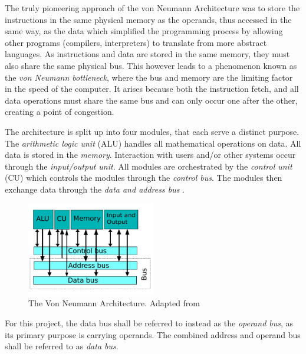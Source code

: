 The truly pioneering approach of the von Neumann Architecture was to store the instructions in the same physical memory as the operands, thus accessed in the same way, as the data which simplified the programming process by allowing other programs (compilers, interpreters) to translate from more abstract languages. As instructions and data are stored in the same memory, they must also share the same physical bus. This however leads  to a phenomenon known as the \textit{von Neumann bottleneck}, where the bus and memory are the limiting factor in the speed of the computer. It arises because both the instruction fetch, and all data operations must share the same bus and can only occur one after the other, creating a point of congestion. 

The architecture is split up into four modules, that each serve a distinct purpose. The \textit{arithmetic logic unit} (ALU) handles all mathematical operations on data. All data is stored in the \textit{memory}. Interaction with users and/or other systems occur through the \textit{input/output unit}. All modules are orchestrated by the \textit{control unit} (CU) which controls the modules through the \textit{control bus}. The modules then exchange data through the \textit{data and address bus} \cite{vonneumann1} \cite{vonneumann2}.

\begin{figure}[H]
  \begin{center}
    \includegraphics[width=0.5\textwidth]{figures/VNA}
  \end{center}
  \caption{The Von Neumann Architecture. Adapted from \cite{fig-vna}}\label{fig:vna}
\end{figure}

For this project, the data bus shall be referred to instead as the \textit{operand bus}, as its primary purpose is carrying operands. The combined address and operand bus shall be referred to as \textit{data bus}.

